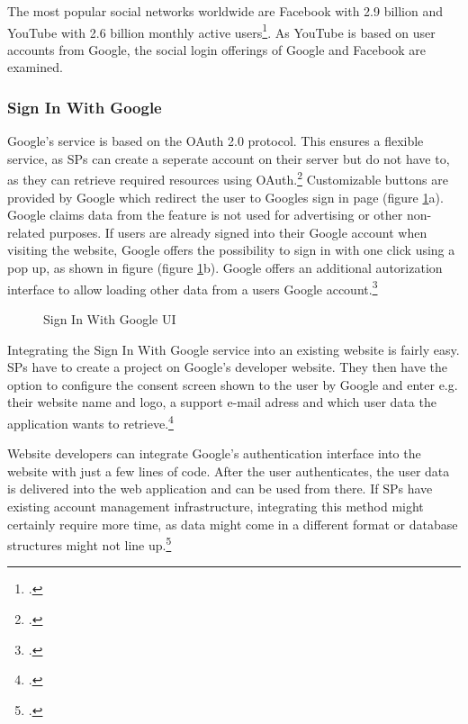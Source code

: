 The most popular social networks worldwide are Facebook with 2.9 billion and YouTube with 2.6 billion monthly 
active users\footcite[Cp.][]{StatistaSocial2022}.
As YouTube is based on user accounts from Google, the social login offerings of Google and Facebook are examined.

\subsubsection{Sign In With Google}
\label{sec:sign_in_with_google}

Google's service is based on the OAuth 2.0 protocol. This ensures a flexible service,
as \acp{SP} can create a seperate account on their server but do not have to, as they can retrieve
required resources using OAuth.\footcite[Cp.][]{GoogleSignIn2022}
Customizable buttons are provided by Google which redirect the user to Googles sign in page (figure \ref{fig:google_sign_in_ui}a).
Google claims data from the feature is not used for advertising or other non-related purposes.
If users are already signed into their Google account when visiting the website, Google offers the
possibility to sign in with one click using a pop up, as shown in figure (figure \ref{fig:google_sign_in_ui}b).
Google offers an additional autorization interface to allow loading other data from a users Google account.\footcite[Cp.][]{GoogleSignIn2022}

\begin{figure}[H]
    \caption{Sign In With Google UI}%
    \centering
    \hfill
    \hfill
    \cite[Source:][]{GoogleSignIn2022}
    \label{fig:google_sign_in_ui}%
\end{figure}

Integrating the Sign In With Google service into an existing website is fairly easy.
\acp{SP} have to create a project on Google's developer website. They then have the option
to configure the consent screen shown to the user by Google and enter e.g. their website name and logo,
a support e-mail adress and which user data the application wants to retrieve.\footcite[Cp.][]{GoogleSignIn2022}

Website developers can integrate Google's authentication interface into the website with just a few lines of code.
After the user authenticates, the user data is delivered into the web application and can be used from there.
If \acp{SP} have existing account management infrastructure, integrating this method might certainly require
more time, as data might come in a different format or database structures might not line up.\footcite[Cp.][]{GoogleSignIn2022}






